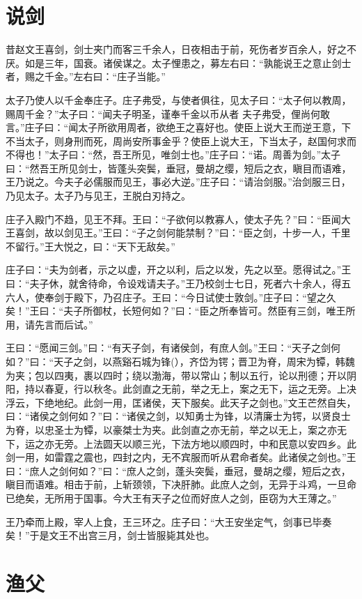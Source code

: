 \documentclass[a4paper,12pt,UTF8,twoside]{ctexbook}
\begin{document}
\section{说剑}

昔赵文王喜剑，剑士夹门而客三千余人，日夜相击于前，死伤者岁百余人，好之不厌。如是三年，国衰。诸侯谋之。太子悝患之，募左右曰：“孰能说王之意止剑士者，赐之千金。”左右曰：“庄子当能。”

太子乃使人以千金奉庄子。庄子弗受，与使者俱往，见太子曰：“太子何以教周，赐周千金？”太子曰：“闻夫子明圣，谨奉千金以币从者 夫子弗受，俚尚何敢言。”庄子曰：“闻太子所欲用周者，欲绝王之喜好也。使臣上说大王而逆王意，下不当太子，则身刑而死，周尚安所事金乎？使臣上说大王，下当太子，赵国何求而不得也！”太子曰：“然，吾王所见，唯剑士也。”庄子曰：“诺。周善为剑。”太子曰：“然吾王所见剑士，皆蓬头突鬓，垂冠，曼胡之缨，短后之衣，瞋目而语难， 王乃说之。今夫子必儒服而见王，事必大逆。”庄子曰：“请治剑服。”治剑服三日，乃见太子。太子乃与见王，王脱白刃持之。

庄子入殿门不趋，见王不拜。王曰：“子欲何以教寡人，使太子先？”曰：“臣闻大王喜剑，故以剑见王。”王曰：“子之剑何能禁制？”曰：“臣之剑，十步一人，千里不留行。”王大悦之，曰：“天下无敌矣。”

庄子曰：“夫为剑者，示之以虚，开之以利，后之以发，先之以至。愿得试之。”王曰：“夫子休，就舍待命，令设戏请夫子。”王乃校剑士七日，死者六十余人，得五六人，使奉剑于殿下，乃召庄子。王曰：“今日试使士敦剑。”庄子曰：“望之久矣！”王曰：“夫子所御杖，长短何如？”曰：“臣之所奉皆可。然臣有三剑，唯王所用，请先言而后试。”

王曰：“愿闻三剑。”曰：“有天子剑，有诸侯剑，有庶人剑。”王曰：“天子之剑何如？”曰：“天子之剑，以燕谿石城为锋(），齐岱为锷；晋卫为脊，周宋为镡，韩魏为夹；包以四夷，裹以四时；绕以渤海，带以常山；制以五行，论以刑德；开以阴阳，持以春夏，行以秋冬。此剑直之无前，举之无上，案之无下，运之无旁。上决浮云，下绝地纪。此剑一用，匡诸侯，天下服矣。此天子之剑也。”文王芒然自失，曰：“诸侯之剑何如？”曰：“诸侯之剑，以知勇士为锋，以清廉士为锷，以贤良士为脊，以忠圣士为镡，以豪桀士为夹。此剑直之亦无前，举之以无上，案之亦无下，运之亦无旁。上法圆天以顺三光，下法方地以顺四时，中和民意以安四乡。此剑一用，如雷霆之震也，四封之内，无不宾服而听从君命者矣。此诸侯之剑也。”王曰：“庶人之剑何如？”曰：“庶人之剑，蓬头突鬓，垂冠，曼胡之缨，短后之衣，瞋目而语难。相击于前，上斩颈领，下决肝肺。此庶人之剑，无异于斗鸡，一旦命已绝矣，无所用于国事。今大王有天子之位而好庶人之剑，臣窃为大王薄之。”

王乃牵而上殿，宰人上食，王三环之。庄子曰：“大王安坐定气，剑事已毕奏矣！”于是文王不出宫三月，剑士皆服毙其处也。
\section{渔父}
\end{document}
